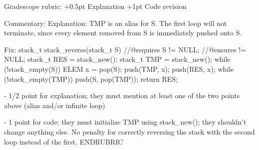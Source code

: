 \begin{parts}
Gradescope rubric:
+0.5pt Explanation
+1pt Code revision

Commentary:
Explanation: TMP is an alias for S. The first loop will not terminate,
since every element removed from S is immediately pushed onto S.

Fix:
stack_t stack_reverse(stack_t S)
//@requires S != NULL;
//@ensures \result != NULL;
{
  stack_t RES = stack_new();
  stack_t TMP = stack_new();
  while (!stack_empty(S)) {
    ELEM x = pop(S);
    push(TMP, x);
    push(RES, x);
  }
  while (!stack_empty(TMP)) push(S, pop(TMP));
  return RES;
}

   - 1/2 point for explanation; they must mention at least one of the
     two points above (alias and/or infinite loop)

   - 1 point for code: they must initialize TMP using stack_new();
     they shouldn't change anything else. No penalty for correctly
     reversing the stack with the second loop instead of the first.
ENDRUBRIC

\end{parts}

\egroup
